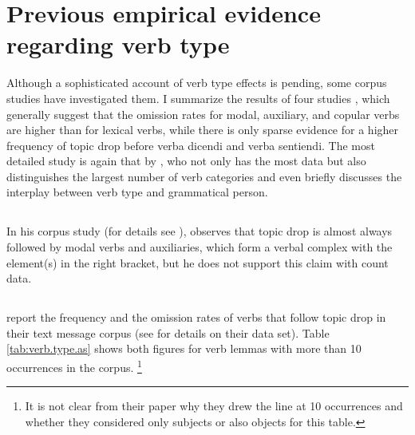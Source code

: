 \section{Previous empirical evidence regarding verb type}\label{sec:usage.verb.type.studies}
Although a sophisticated account of verb type effects is pending, some corpus studies have investigated them. 
I summarize the results of four studies \citep{poitou1993,androutsopoulos.schmidt2002,helmer2016,frick2017}, which generally suggest that the omission rates for modal, auxiliary, and copular verbs are higher than for lexical verbs, while there is only sparse evidence for a higher frequency of topic drop before verba dicendi and verba sentiendi.
The most detailed study is again that by \citet{frick2017}, who not only has the most data but also distinguishes the largest number of verb categories and even briefly discusses the interplay between verb type and grammatical person.

\subsection{\citet{poitou1993}} 
In his corpus study (for details see ), \citet{poitou1993} observes that topic drop is almost always followed by modal verbs and auxiliaries, which form a verbal complex with the element(s) in the right bracket, but he does not support this claim with count data.

\subsection{\citet{androutsopoulos.schmidt2002}}
\citet{androutsopoulos.schmidt2002} report the frequency and the omission rates of verbs that follow topic drop in their text message corpus (see  for details on their data set).
Table \ref{tab:verb.type.as} shows both figures for verb lemmas with more than 10 occurrences in the corpus.%
\footnote{It is not clear from their paper why they drew the line at 10 occurrences and whether they considered only subjects or also objects for this table.}
%


